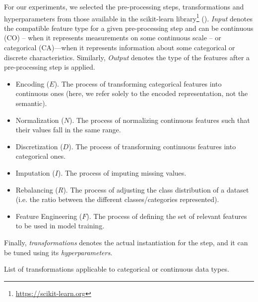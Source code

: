 \begin{example}
For our experiments, we selected the pre-processing steps, transformations and hyperparameters from those available in the scikit-learn library\footnote{\url{https://scikit-learn.org}} ().
\textit{Input} denotes the compatible feature type for a given pre-processing step and can be continuous (CO) -- when it represents measurements on some continuous scale -- or categorical (CA)---when it represents information about some categorical or discrete characteristics.
Similarly, \textit{Output} denotes the type of the features after a pre-processing step is applied.

\begin{itemize}[noitemsep,topsep=0pt]
\item{Encoding ($E$).} The process of transforming categorical features into continuous ones (here, we refer solely to the encoded representation, not the semantic).
\item{Normalization ($N$).} The process of normalizing continuous features such that their values fall in the same range.
\item{Discretization ($D$).} The process of transforming continuous features into categorical ones.
\item{Imputation ($I$).} The process of imputing missing values.
\item{Rebalancing ($R$).} The process of adjusting the class distribution of a dataset (i.e. the ratio between the different classes/categories represented).
\item{Feature Engineering ($F$).} The process of defining the set of relevant features to be used in model training.
\end{itemize}

Finally, \textit{transformations} denotes the actual instantiation for the step, and it can be tuned using its \textit{hyperparameters}.


\begin{table}[!t]
\renewcommand{\arraystretch}{0.3}
\footnotesize
\caption{List of transformations applicable to categorical or continuous data types.}
\centering
\begin{threeparttable}


\end{threeparttable}
\end{table}
\end{example}

